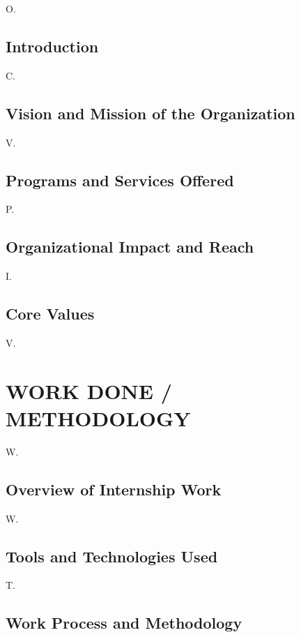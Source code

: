 \documentclass[12pt,a4paper]{report}
\begin{document}
O.


\section{Introduction}

C.




\section{Vision and Mission of the Organization}

V.


\section{Programs and Services Offered}

P.


\section{Organizational Impact and Reach}

I.


\section{Core Values}

V.




\chapter{WORK DONE / METHODOLOGY}


W.


\section{Overview of Internship Work}

W.


\section{Tools and Technologies Used}

T.




\section{Work Process and Methodology}
\end{document}
